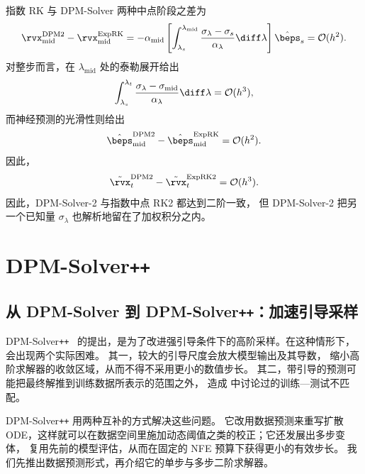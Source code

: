 指数 RK 与 DPM-Solver 两种中点阶段之差为
\[
\rvx_{\mathrm{mid}}^{\mathrm{DPM2}}
-
\rvx_{\mathrm{mid}}^{\mathrm{ExpRK}}
=
-
\alpha_{\mathrm{mid}}
\left[
\int_{\lambda_s}^{\lambda_{\mathrm{mid}}}
\frac{\sigma_\lambda-\sigma_s}{\alpha_\lambda}
\diff\lambda
\right]
\hat\beps_s
=
\mathcal O(h^2).
\]
对整步而言，在 $\lambda_{\mathrm{mid}}$ 处的泰勒展开给出
\[
\int_{\lambda_s}^{\lambda_t}
\frac{\sigma_\lambda-\sigma_{\mathrm{mid}}}{\alpha_\lambda}
\diff\lambda
=
\mathcal O(h^3),
\]
而神经预测的光滑性则给出
\[
\hat\beps_{\mathrm{mid}}^{\mathrm{DPM2}}
-
\hat\beps_{\mathrm{mid}}^{\mathrm{ExpRK}}
=
\mathcal O(h^2).
\]
因此，
\[
\tilde\rvx_t^{\mathrm{DPM2}}
-
\tilde\rvx_t^{\mathrm{ExpRK2}}
=
\mathcal O(h^3).
\]
因此，DPM-Solver-2 与指数中点 RK2 都达到二阶一致，
但 DPM-Solver-2 把另一个已知量 $\sigma_\lambda$
也解析地留在了加权积分之内。



\section{\texorpdfstring{DPM-Solver\texttt{++}}{DPM-Solver\texttt{++}}}\label{sec:dpm++}


\subsection{从 DPM-Solver 到 DPM-Solver\texttt{++}：加速引导采样}

DPM-Solver\texttt{++}~\citep{lu2022dpm2} 的提出，是为了改进强引导条件下的高阶采样。在这种情形下，会出现两个实际困难。
其一，较大的引导尺度会放大模型输出及其导数，
缩小高阶求解器的收敛区域，从而不得不采用更小的数值步长。
其二，带引导的预测可能把最终解推到训练数据所表示的范围之外，
造成  中讨论过的训练—测试不匹配。

DPM-Solver\texttt{++} 用两种互补的方式解决这些问题。
它改用数据预测来重写扩散 ODE，这样就可以在数据空间里施加动态阈值之类的校正；它还发展出多步变体，
复用先前的模型评估，从而在固定的 NFE 预算下获得更小的有效步长。
我们先推出数据预测形式，再介绍它的单步与多步二阶求解器。


